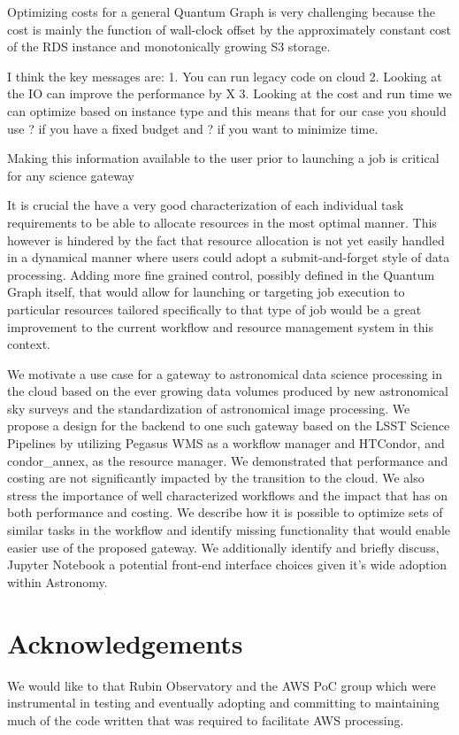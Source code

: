\documentclass[a4paper, 10pt, conference]{ieeeconf}
\begin{document}
Optimizing costs for a general Quantum Graph is very challenging because the cost is mainly the function of wall-clock offset by the approximately constant cost of the RDS instance and monotonically growing S3 storage. 


I think the key messages are:
1. You can run legacy code on cloud
2. Looking at the IO can improve the performance by X
3. Looking at the cost and run time we can optimize based on instance type and this means that for our case you should use ? if you have a fixed budget and ? if you want to minimize time.

Making this information available to the user prior to launching a job is critical for any science gateway


It is crucial the have a very good characterization of each individual task requirements to be able to allocate resources in the most optimal manner. This however is hindered by the fact that resource allocation is not yet easily handled in a dynamical manner where users could adopt a submit-and-forget style of data processing. Adding more fine grained control, possibly defined in the Quantum Graph itself, that would allow for launching or targeting job execution to particular resources tailored specifically to that type of job would be a great improvement to the current workflow and resource management system in this context.

We motivate a use case for a gateway to astronomical data science processing in the cloud based on the ever growing data volumes produced by new astronomical sky surveys and the standardization of astronomical image processing. We propose a design for the backend to one such gateway based on the LSST Science Pipelines by utilizing Pegasus WMS as a workflow manager and HTCondor, and condor\_annex, as the resource manager. We demonstrated that performance and costing are not significantly impacted by the transition to the cloud. We also stress the importance of well characterized workflows and the impact that has on both performance and costing. We describe how it is possible to optimize sets of similar tasks in the workflow and identify missing functionality that would enable easier use of the proposed gateway. We additionally identify and briefly discuss, Jupyter Notebook a potential front-end interface choices given it's wide adoption within Astronomy. 






\section{Acknowledgements}
\noindent We would like to that Rubin Observatory and the AWS PoC group which were instrumental in testing and eventually adopting and committing to maintaining much of the code written that was required to facilitate AWS processing. 
\clearpage
\end{document}
